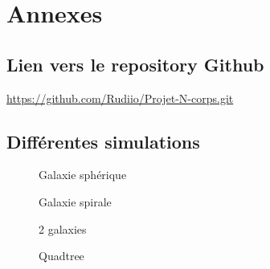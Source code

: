 \chapter*{Annexes}

\makeatletter
\renewcommand{\thesection}{\@arabic\c@section}
\makeatother

\appendix
\section{Lien vers le repository Github}
\url{https://github.com/Rudiio/Projet-N-corps.git}

\section{Différentes simulations}

\begin{figure}[H]
\begin{minipage}[b]{.46\linewidth}
\centering{}
\caption{Galaxie sphérique
    \label{fig16}
    }
\end{minipage} \hfill
\begin{minipage}[b]{.46\linewidth}
\centering{}
\caption{Galaxie spirale\label{fig17}}
\end{minipage}
\end{figure}

\begin{figure}[H]
\begin{minipage}[b]{.46\linewidth}
\centering{}
\caption{2 galaxies\label{fig18}}
\end{minipage} \hfill
\begin{minipage}[b]{.46\linewidth}
\centering{}
\caption{Quadtree\label{fig19}}
\end{minipage}
\end{figure}
